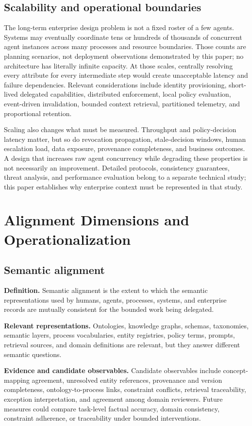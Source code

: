 \documentclass[11pt,letterpaper]{article}
\begin{document}
\subsection{Scalability and operational boundaries}
The long-term enterprise design problem is not a fixed roster of a few agents. Systems may eventually coordinate tens or hundreds of thousands of concurrent agent instances across many processes and resource boundaries. Those counts are planning scenarios, not deployment observations demonstrated by this paper; no architecture has literally infinite capacity. At those scales, centrally resolving every attribute for every intermediate step would create unacceptable latency and failure dependencies. Relevant considerations include identity provisioning, short-lived delegated capabilities, distributed enforcement, local policy evaluation, event-driven invalidation, bounded context retrieval, partitioned telemetry, and proportional retention.

Scaling also changes what must be measured. Throughput and policy-decision latency matter, but so do revocation propagation, stale-decision windows, human escalation load, data exposure, provenance completeness, and business outcomes. A design that increases raw agent concurrency while degrading these properties is not necessarily an improvement. Detailed protocols, consistency guarantees, threat analysis, and performance evaluation belong to a separate technical study; this paper establishes why enterprise context must be represented in that study.


\section{Alignment Dimensions and Operationalization}
\subsection{Semantic alignment}
\textbf{Definition.} Semantic alignment is the extent to which the semantic representations used by humans, agents, processes, systems, and enterprise records are mutually consistent for the bounded work being delegated.

\textbf{Relevant representations.} Ontologies, knowledge graphs, schemas, taxonomies, semantic layers, process vocabularies, entity registries, policy terms, prompts, retrieval sources, and domain definitions are relevant, but they answer different semantic questions.

\textbf{Evidence and candidate observables.} Candidate observables include concept-mapping agreement, unresolved entity references, provenance and version completeness, ontology-to-process links, constraint conflicts, retrieval traceability, exception interpretation, and agreement among domain reviewers. Future measures could compare task-level factual accuracy, domain consistency, constraint adherence, or traceability under bounded interventions.
\end{document}
